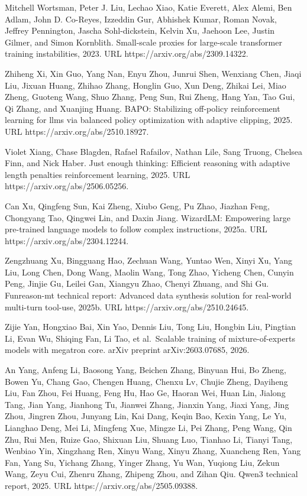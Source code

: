 Mitchell Wortsman, Peter J. Liu, Lechao Xiao, Katie Everett, Alex Alemi,
Ben Adlam, John D. Co-Reyes, Izzeddin Gur, Abhishek Kumar, Roman Novak,
Jeffrey Pennington, Jascha Sohl-dickstein, Kelvin Xu, Jaehoon Lee, Justin
Gilmer, and Simon Kornblith. Small-scale proxies for large-scale
transformer training instabilities, 2023. URL
https://arxiv.org/abs/2309.14322.

Zhiheng Xi, Xin Guo, Yang Nan, Enyu Zhou, Junrui Shen, Wenxiang Chen,
Jiaqi Liu, Jixuan Huang, Zhihao Zhang, Honglin Guo, Xun Deng, Zhikai
Lei, Miao Zheng, Guoteng Wang, Shuo Zhang, Peng Sun, Rui Zheng, Hang
Yan, Tao Gui, Qi Zhang, and Xuanjing Huang. BAPO: Stabilizing off-policy
reinforcement learning for llms via balanced policy optimization with
adaptive clipping, 2025. URL https://arxiv.org/abs/2510.18927.

Violet Xiang, Chase Blagden, Rafael Rafailov, Nathan Lile, Sang Truong,
Chelsea Finn, and Nick Haber. Just enough thinking: Efficient reasoning
with adaptive length penalties reinforcement learning, 2025. URL
https://arxiv.org/abs/2506.05256.

Can Xu, Qingfeng Sun, Kai Zheng, Xiubo Geng, Pu Zhao, Jiazhan Feng,
Chongyang Tao, Qingwei Lin, and Daxin Jiang. WizardLM: Empowering large
pre-trained language models to follow complex instructions, 2025a. URL
https://arxiv.org/abs/2304.12244.

Zengzhuang Xu, Bingguang Hao, Zechuan Wang, Yuntao Wen, Xinyi Xu, Yang
Liu, Long Chen, Dong Wang, Maolin Wang, Tong Zhao, Yicheng Chen, Cunyin
Peng, Jinjie Gu, Leilei Gan, Xiangyu Zhao, Chenyi Zhuang, and Shi Gu.
Funreason-mt technical report: Advanced data synthesis solution for
real-world multi-turn tool-use, 2025b. URL
https://arxiv.org/abs/2510.24645.

Zijie Yan, Hongxiao Bai, Xin Yao, Dennis Liu, Tong Liu, Hongbin Liu,
Pingtian Li, Evan Wu, Shiqing Fan, Li Tao, et al.~Scalable training of
mixture-of-experts models with megatron core. arXiv preprint
arXiv:2603.07685, 2026.

An Yang, Anfeng Li, Baosong Yang, Beichen Zhang, Binyuan Hui, Bo Zheng,
Bowen Yu, Chang Gao, Chengen Huang, Chenxu Lv, Chujie Zheng, Dayiheng
Liu, Fan Zhou, Fei Huang, Feng Hu, Hao Ge, Haoran Wei, Huan Lin, Jialong
Tang, Jian Yang, Jianhong Tu, Jianwei Zhang, Jianxin Yang, Jiaxi Yang,
Jing Zhou, Jingren Zhou, Junyang Lin, Kai Dang, Keqin Bao, Kexin Yang,
Le Yu, Lianghao Deng, Mei Li, Mingfeng Xue, Mingze Li, Pei Zhang, Peng
Wang, Qin Zhu, Rui Men, Ruize Gao, Shixuan Liu, Shuang Luo, Tianhao Li,
Tianyi Tang, Wenbiao Yin, Xingzhang Ren, Xinyu Wang, Xinyu Zhang,
Xuancheng Ren, Yang Fan, Yang Su, Yichang Zhang, Yinger Zhang, Yu Wan,
Yuqiong Liu, Zekun Wang, Zeyu Cui, Zhenru Zhang, Zhipeng Zhou, and Zihan
Qiu. Qwen3 technical report, 2025. URL https://arxiv.org/abs/2505.09388.

